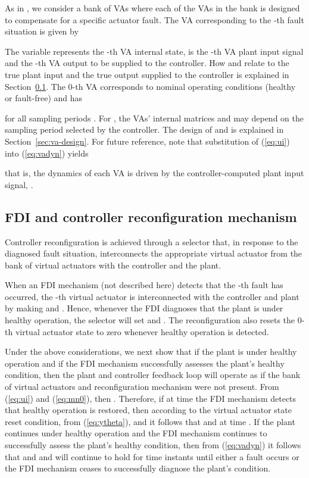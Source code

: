 \documentclass[letterpaper, 10 pt, conference]{ieeeconf}
\begin{document}
As in \cite{seron_bankVA_ifac11}, we consider a bank of VAs where each of the VAs in the bank is designed to compensate for a specific actuator fault.
The VA corresponding to the -th fault situation  is given by

The variable  represents the -th VA internal state, 
is the -th VA plant input signal and  the -th VA output to
be supplied to the controller. How  and  relate to the true
plant input  and the true output supplied to the controller 
is explained in Section~\ref{sec:sw-logic}. The 0-th VA corresponds to
nominal operating conditions (healthy or fault-free) and has

for all sampling periods . For , the VAs' internal
matrices  and  may depend on the sampling period 
selected by the controller. The design of  and  is
explained in Section~\ref{sec:va-design}. For future reference, note
that substitution of (\ref{eq:ui}) into (\ref{eq:vadyn}) yields

that is, the dynamics of each VA is driven by the controller-computed
plant input signal, .


\subsection{FDI and controller reconfiguration mechanism} \label{sec:sw-logic}

Controller reconfiguration is achieved through a selector that, in
response to the diagnosed fault situation, interconnects the
appropriate virtual actuator from the bank of virtual actuators with
the controller and the plant.

When an FDI mechanism (not described here) detects that the -th
fault has occurred, the -th virtual actuator is interconnected with
the controller and plant by making  and . Hence,
whenever the FDI diagnoses that the plant is under healthy operation,
the selector will set  and . The reconfiguration also
resets the 0-th virtual actuator state  to zero whenever
healthy operation is detected.

Under the above considerations, we next show that if the plant is
under healthy operation and if the FDI mechanism successfully assesses
the plant's healthy condition, then the plant and controller feedback
loop will operate as if the bank of virtual actuators and
reconfiguration mechanism were not present. From (\ref{eq:ui}) and
(\ref{eq:mn0}), then . Therefore, if at time  the FDI
mechanism detects that healthy operation is restored, then  according to the virtual actuator state reset condition, 
from (\ref{eq:ytheta}), and it follows that  and
 at time . If the plant continues under healthy
operation and the FDI mechanism continues to successfully assess the
plant's healthy condition, then from (\ref{eq:vadyn}) it follows that
 and  and  will continue to
hold for time instants  until either a fault occurs or the
FDI mechanism ceases to successfully diagnose the plant's condition.
\end{document}
